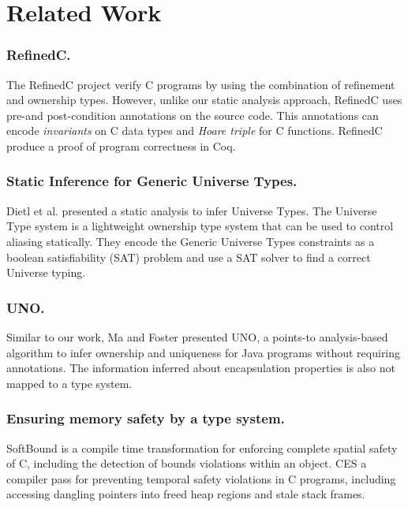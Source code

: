 \section{Related Work}
\label{sec:relatedwork}

\subsubsection{RefinedC.} The RefinedC project \cite{10.1145/3453483.3454036} verify C programs by using the combination of refinement and ownership
types. However, unlike our static analysis approach, RefinedC uses pre-and post-condition annotations on the source code.
This annotations can encode \textit{invariants} on C data types and \textit{Hoare triple} for C functions. RefinedC produce a proof of program correctness in Coq.

\subsubsection{Static Inference for Generic Universe Types.} 

Dietl et al. \cite{10.1007/978-3-642-22655-7_16, 10.1145/2049706.2049709} presented a static analysis to infer Universe Types. The Universe Type system is a lightweight ownership type system that can be used to control aliasing statically. They encode the Generic Universe Types constraints as a boolean satisfiability (SAT) problem and use a SAT solver to find a correct Universe typing. 

\subsubsection{UNO.}
Similar to our work, Ma and Foster \cite{10.1145/1297105.1297059} presented UNO, a points-to analysis-based algorithm to infer ownership and uniqueness for Java programs without requiring annotations.
The information inferred about encapsulation properties is also not mapped to a type system.

\subsubsection{Ensuring memory safety by a type system.} SoftBound \cite{10.1145/1542476.1542504} is a compile time transformation for enforcing complete spatial safety of C, including the detection of bounds violations within an object. CES \cite{10.1145/1806651.1806657} a compiler pass for preventing temporal safety violations in C programs, including accessing dangling pointers into freed heap regions and stale stack frames.

